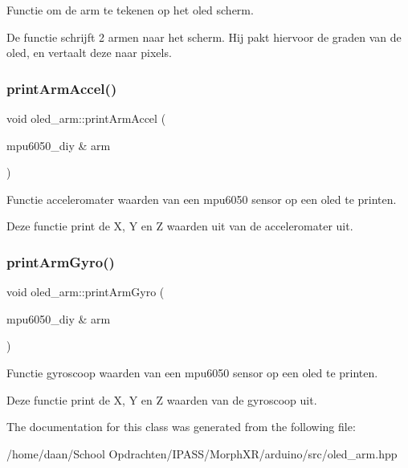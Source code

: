 Functie om de arm te tekenen op het oled scherm. 

De functie schrijft 2 armen naar het scherm. Hij pakt hiervoor de graden van de oled, en vertaalt deze naar pixels. \mbox{\label{classoled__arm_ae5eecd55d90a5c6137bfc4cef0cbcb2f}} 
\subsubsection{\texorpdfstring{print\+Arm\+Accel()}{printArmAccel()}}
{\footnotesize\ttfamily void oled\+\_\+arm\+::print\+Arm\+Accel (\begin{DoxyParamCaption}\item[{mpu6050\+\_\+diy \&}]{arm }\end{DoxyParamCaption})\hspace{0.3cm}{\ttfamily [inline]}}



Functie acceleromater waarden van een mpu6050 sensor op een oled te printen. 

Deze functie print de X, Y en Z waarden uit van de acceleromater uit. \mbox{\label{classoled__arm_a35bcedc3e023c1744420fdc377ca980c}} 
\subsubsection{\texorpdfstring{print\+Arm\+Gyro()}{printArmGyro()}}
{\footnotesize\ttfamily void oled\+\_\+arm\+::print\+Arm\+Gyro (\begin{DoxyParamCaption}\item[{mpu6050\+\_\+diy \&}]{arm }\end{DoxyParamCaption})\hspace{0.3cm}{\ttfamily [inline]}}



Functie gyroscoop waarden van een mpu6050 sensor op een oled te printen. 

Deze functie print de X, Y en Z waarden van de gyroscoop uit. 

The documentation for this class was generated from the following file\+:\begin{DoxyCompactItemize}
\item 
/home/daan/\+School Opdrachten/\+I\+P\+A\+S\+S/\+Morph\+X\+R/arduino/src/oled\+\_\+arm.\+hpp\end{DoxyCompactItemize}
